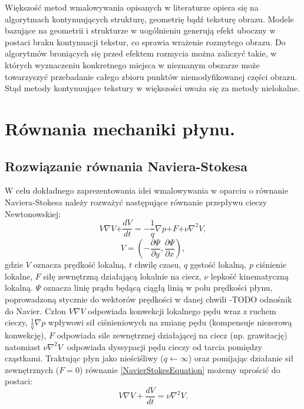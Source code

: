 \documentclass[12pt, twoside, openany]{report}
\theoremstyle{definition}
\begin{document}
Większość metod wmalowywania opisanych w literaturze opiera się na algorytmach kontynuujących strukturę, geometrię bądź teksturę obrazu. Modele bazujące na geometrii i strukturze w uogólnieniu generują efekt uboczny w postaci braku kontynuacji tekstur, co sprawia wrażenie rozmytego obrazu. Do algorytmów broniących się przed efektem rozmycia można zaliczyć takie, w których wyznaczeniu konkretnego miejsca w nieznanym obszarze może towarzyszyć przebadanie całego zbioru punktów niemodyfikowanej części obrazu. Stąd metody kontynuujące tekstury w większości uważa się za metody nielokalne.
\chapter{Równania mechaniki płynu.}
\label{chap:navierstokes}
\section{Rozwiązanie równania Naviera-Stokesa }
\label{sec:snavierstokes}
W celu dokładnego zaprezentowania idei wmalowywania w oparciu o równanie Naviera-Stokesa należy rozważyć następujące równanie przepływu cieczy Newtonowskiej:
\begin{equation}
V \nabla V \mathrm{+} \frac{dV}{dt} = - \frac{\mathrm{1}}{q}\nabla p\mathrm{+}F \mathrm{+}\nu {\nabla }^{\mathrm{2}} V
\label{NavierStokesEquation}
,
\end{equation}
\begin{equation}
V = \left( -\frac{\partial\Psi}{\partial y},\frac{\partial \Psi}{\partial x} \right)
\label{LiquidVelociy}
,
\end{equation}
gdzie $V$ oznacza prędkość lokalną, $t$ chwilę czasu, $q$ gęstość lokalną, $p$ ciśnienie lokalne, $F$ siłę zewnętrzną działającą lokalnie na ciecz, $\nu$ lepkość kinematyczną lokalną. $\mathit{\Psi}$ oznacza linię prądu będącą ciągłą linią w polu prędkości płynu, poprowadzoną
stycznie do wektorów prędkości w danej chwili -TODO odnośnik do Navier. Człon $V\nabla V$ odpowiada konwekcji lokalnego pędu wraz z ruchem cieczy, $\frac{1}{q}\nabla p$ wpływowi sił ciśnieniowych na zmianę pędu (kompensuje niezerową konwekcję),  $F$ odpowiada sile zewnętrznej działającej na ciecz (np. grawitację) natomiast $\nu {\nabla }^2V\ $ odpowiada dyssypacji pędu cieczy od tarcia pomiędzy cząstkami. Traktując płyn jako nieściśliwy ($q \leftarrow \infty $)  oraz pomijając działanie sił zewnętrznych ($F=0$)  równanie \eqref{NavierStokesEquation} możemy uprościć do postaci:
\begin{equation}
 V\nabla V+\frac{dV}{dt}=\nu {\nabla }^2V
\label{NavierStokesEquationShort}
.
\end{equation}
\end{document}
